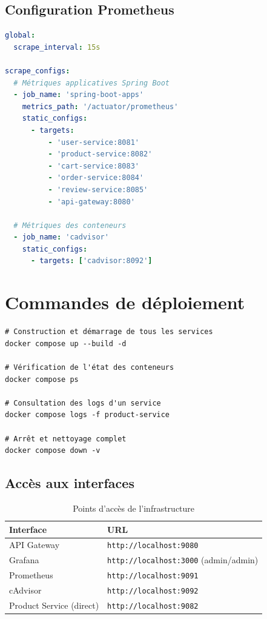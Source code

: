 \subsection{Configuration Prometheus}

\begin{lstlisting}[language=YAML, caption={monitoring/prometheus.yml - Cibles de scraping}]
global:
  scrape_interval: 15s

scrape_configs:
  # Métriques applicatives Spring Boot
  - job_name: 'spring-boot-apps'
    metrics_path: '/actuator/prometheus'
    static_configs:
      - targets:
          - 'user-service:8081'
          - 'product-service:8082'
          - 'cart-service:8083'
          - 'order-service:8084'
          - 'review-service:8085'
          - 'api-gateway:8080'

  # Métriques des conteneurs
  - job_name: 'cadvisor'
    static_configs:
      - targets: ['cadvisor:8092']
\end{lstlisting}

\section{Commandes de déploiement}

\begin{lstlisting}[caption={Démarrage de l'infrastructure complète}]
# Construction et démarrage de tous les services
docker compose up --build -d

# Vérification de l'état des conteneurs
docker compose ps

# Consultation des logs d'un service
docker compose logs -f product-service

# Arrêt et nettoyage complet
docker compose down -v
\end{lstlisting}

\subsection{Accès aux interfaces}

\begin{table}[H]
\centering
\begin{tabular}{ll}
\toprule
\textbf{Interface} & \textbf{URL} \\
\midrule
API Gateway & \texttt{http://localhost:9080} \\
Grafana & \texttt{http://localhost:3000} (admin/admin) \\
Prometheus & \texttt{http://localhost:9091} \\
cAdvisor & \texttt{http://localhost:9092} \\
Product Service (direct) & \texttt{http://localhost:9082} \\
\bottomrule
\end{tabular}
\caption{Points d'accès de l'infrastructure}
\end{table}

